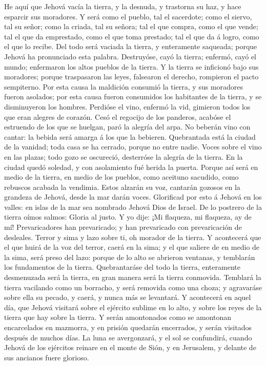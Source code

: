  He aquí que Jehová vacía la tierra, y la desnuda, y
trastorna su haz, y hace esparcir sus moradores.  Y será
como el pueblo, tal el sacerdote; como el siervo, tal su señor; como la
criada, tal su señora; tal el que compra, como el que vende; tal el que
da emprestado, como el que toma prestado; tal el que da á logro, como el
que lo recibe.  Del todo será vaciada la tierra, y
enteramente saqueada; porque Jehová ha pronunciado esta palabra.
 Destruyóse, cayó la tierra; enfermó, cayó el mundo;
enfermaron los altos pueblos de la tierra.  Y la tierra se
inficionó bajo sus moradores; porque traspasaron las leyes, falsearon el
derecho, rompieron el pacto sempiterno.  Por esta causa la
maldición consumió la tierra, y sus moradores fueron asolados; por esta
causa fueron consumidos los habitantes de la tierra, y se disminuyeron
los hombres.  Perdióse el vino, enfermó la vid, gimieron
todos los que eran alegres de corazón.  Cesó el regocijo
de los panderos, acabóse el estruendo de los que se huelgan, paró la
alegría del arpa.  No beberán vino con cantar: la bebida
será amarga á los que la bebieren.  Quebrantada está la
ciudad de la vanidad; toda casa se ha cerrado, porque no entre nadie.
 Voces sobre el vino en las plazas; todo gozo se
oscureció, desterróse la alegría de la tierra.  En la
ciudad quedó soledad, y con asolamiento fué herida la puerta.
 Porque así será en medio de la tierra, en medio de los
pueblos, como aceituno sacudido, como rebuscos acabada la vendimia.
 Estos alzarán su voz, cantarán gozosos en la grandeza de
Jehová, desde la mar darán voces.  Glorificad por esto á
Jehová en los valles: en islas de la mar sea nombrado Jehová Dios de
Israel.  De lo postrero de la tierra oímos salmos: Gloria
al justo. Y yo dije: ¡Mi flaqueza, mi flaqueza, ay de mí! Prevaricadores
han prevaricado; y han prevaricado con prevaricación de desleales.
 Terror y sima y lazo sobre ti, oh morador de la tierra.
 Y acontecerá que el que huirá de la voz del terror,
caerá en la sima; y el que saliere de en medio de la sima, será preso
del lazo: porque de lo alto se abrieron ventanas, y temblarán los
fundamentos de la tierra.  Quebrantaráse del todo la
tierra, enteramente desmenuzada será la tierra, en gran manera será la
tierra conmovida.  Temblará la tierra vacilando como un
borracho, y será removida como una choza; y agravaráse sobre ella su
pecado, y caerá, y nunca más se levantará.  Y acontecerá
en aquel día, que Jehová visitará sobre el ejército sublime en lo alto,
y sobre los reyes de la tierra que hay sobre la tierra. 
Y serán amontonados como se amontonan encarcelados en mazmorra, y en
prisión quedarán encerrados, y serán visitados después de muchos días.
 La luna se avergonzará, y el sol se confundirá, cuando
Jehová de los ejércitos reinare en el monte de Sión, y en Jerusalem, y
delante de sus ancianos fuere glorioso.

